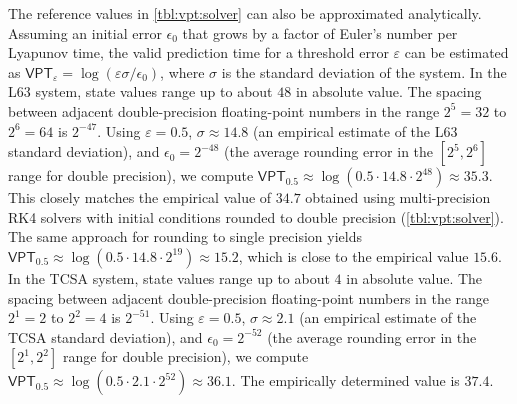 \documentclass{article}
\newcommand{\vpt}[1]{\mathsf{VPT}_{#1}}
\begin{document}
The reference values in \cref{tbl:vpt:solver} can also be approximated analytically. Assuming an initial error $\epsilon_0$ that grows by a factor of Euler's number per Lyapunov time, the valid prediction time for a threshold error $\varepsilon$ can be estimated as $\vpt{\varepsilon} = \log(\varepsilon \sigma / \epsilon_0)$, where $\sigma$ is the standard deviation of the system. In the L63 system, state values range up to about $48$ in absolute value. The spacing between adjacent double-precision floating-point numbers in the range $2^5 = 32$ to $2^6 = 64$ is $2^{-47}$. Using $\varepsilon = 0.5$, $\sigma \approx 14.8$ (an empirical estimate of the L63 standard deviation), and $\epsilon_0 = 2^{-48}$ (the average rounding error in the $[2^5, 2^6]$ range for double precision), we compute $\vpt{0.5} \approx \log(0.5 \cdot 14.8 \cdot 2^{48}) \approx 35.3$. This closely matches the empirical value of $34.7$ obtained using multi-precision RK4 solvers with initial conditions rounded to double precision (\cref{tbl:vpt:solver}). The same approach for rounding to single precision yields $\vpt{0.5} \approx \log(0.5 \cdot 14.8 \cdot 2^{19}) \approx 15.2$, which is close to the empirical value $15.6$. In the TCSA system, state values range up to about $4$ in absolute value. The spacing between adjacent double-precision floating-point numbers in the range $2^1 = 2$ to $2^2 = 4$ is $2^{-51}$. Using $\varepsilon = 0.5$, $\sigma \approx 2.1$ (an empirical estimate of the TCSA standard deviation), and $\epsilon_0 = 2^{-52}$ (the average rounding error in the $[2^1, 2^2]$ range for double precision), we compute $\vpt{0.5} \approx \log(0.5 \cdot 2.1 \cdot 2^{52}) \approx 36.1$. The empirically determined value is $37.4$.
\end{document}
